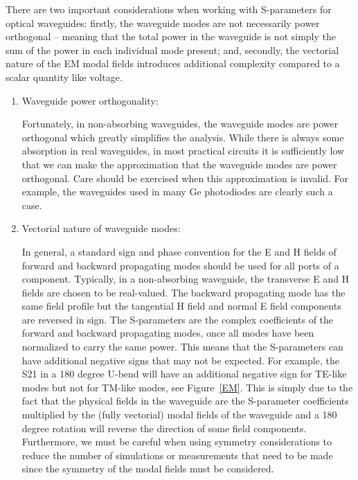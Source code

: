 \documentclass[journal]{spie}
\begin{document}
There are two important considerations when working with S-parameters for optical waveguides: firstly, the waveguide modes are not necessarily power orthogonal -- meaning that the total power in the waveguide is not simply the sum of the power in each individual mode present; and, secondly, the vectorial nature of the EM modal fields introduces additional complexity compared to a scalar quantity like voltage.
\begin{enumerate}
\item Waveguide power orthogonality:

Fortunately, in non-absorbing waveguides, the waveguide modes are power orthogonal which greatly simplifies the analysis. While there is always some absorption in real waveguides, in most practical circuits it is sufficiently low that we can make the approximation that the waveguide modes are power orthogonal. Care should be exercised when this approximation is invalid.  For example, the waveguides used in many Ge photodiodes are clearly such a case.

\item Vectorial nature of waveguide modes:

In general, a standard sign and phase convention for the E and H fields of forward and backward propagating modes should be used for all ports of a component. Typically, in a non-absorbing waveguide, the transverse E and H fields are chosen to be real-valued. The backward propagating mode has the same field profile but the tangential H field and normal E field components are reversed in sign. The S-parameters are the complex coefficients of the forward and backward propagating modes, once all modes have been normalized to carry the same power. This means that the S-parameters can have additional negative signs that may not be expected. For example, the S21 in a 180 degree U-bend will have an additional negative sign for TE-like modes but not for TM-like modes, see Figure~\ref{EM}.  This is simply due to the fact that the physical fields in the waveguide are the S-parameter coefficients multiplied by the (fully vectorial) modal fields of the waveguide and a 180 degree rotation will reverse the direction of some field components. Furthermore, we must be careful when using symmetry considerations to reduce the number of simulations or measurements that need to be made since the symmetry of the modal fields must be considered.
\end{enumerate}

%	
\end{document}
